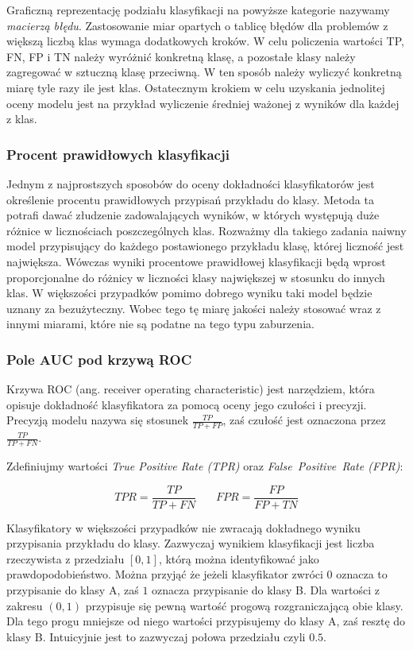 \documentclass[a4paper, twoside, 11pt, openright]{article}
\begin{document}

Graficzną reprezentację podziału klasyfikacji na powyższe kategorie nazywamy \textit{macierzą błędu}. Zastosowanie miar opartych o tablicę błędów dla problemów z większą liczbą klas wymaga dodatkowych kroków. W celu policzenia wartości TP, FN, FP i TN należy wyróżnić konkretną klasę, a pozostałe klasy należy zagregować w sztuczną klasę przeciwną. W ten sposób należy wyliczyć konkretną miarę tyle razy ile jest klas. Ostatecznym krokiem w celu uzyskania jednolitej oceny modelu jest na przykład wyliczenie średniej ważonej z wyników dla każdej z klas.


\subsubsection{Procent prawidłowych klasyfikacji}

Jednym z najprostszych sposobów do oceny dokładności klasyfikatorów jest określenie procentu prawidłowych przypisań przykładu do klasy. Metoda ta potrafi dawać złudzenie zadowalających wyników, w których występują duże różnice w licznościach poszczególnych klas. Rozważmy dla takiego zadania naiwny model przypisujący do każdego postawionego przykładu klasę, której liczność jest największa. Wówczas wyniki procentowe prawidłowej klasyfikacji będą wprost proporcjonalne do różnicy w liczności klasy największej w stosunku do innych klas. W większości przypadków pomimo dobrego wyniku taki model będzie uznany za bezużyteczny. Wobec tego tę miarę jakości należy stosować wraz z innymi miarami, które nie są podatne na tego typu zaburzenia.

\subsubsection{Pole AUC pod krzywą ROC \cite{roc}}

Krzywa ROC (ang. receiver operating characteristic) jest narzędziem, która opisuje dokładność klasyfikatora za pomocą oceny jego czułości i precyzji. Precyzją modelu nazywa się stosunek $\frac{TP}{TP+FP}$, zaś czułość jest oznaczona przez $\frac{TP}{TP+FN}$.

\bigskip

Zdefiniujmy wartości \textit{True Positive Rate (TPR)} oraz \textit{False\ Positive\ Rate (FPR)}:

$$ TPR = \frac{TP}{TP+FN}\ \ \ \ \ \ \ \ FPR = \frac{FP}{FP+TN} $$

Klasyfikatory w większości przypadków nie zwracają dokładnego wyniku przypisania przykładu do klasy. Zazwyczaj wynikiem klasyfikacji jest liczba rzeczywista z przedziału $[0, 1]$, którą można identyfikować jako prawdopodobieństwo. Można przyjąć że jeżeli klasyfikator zwróci $0$ oznacza to przypisanie do klasy A, zaś $1$ oznacza przypisanie do klasy B. Dla wartości z zakresu $(0, 1)$ przypisuje się pewną wartość progową rozgraniczającą obie klasy. Dla tego progu mniejsze od niego wartości przypisujemy do klasy A, zaś resztę do klasy B. Intuicyjnie jest to zazwyczaj połowa przedziału czyli $0.5$.
\end{document}
